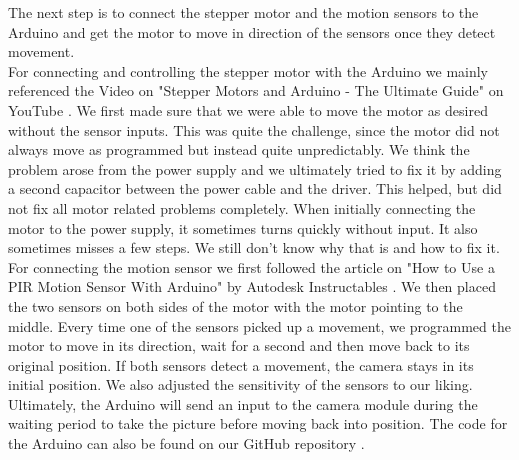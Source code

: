 \documentclass{article}
\begin{document}
The next step is to connect the stepper motor and the motion sensors to the Arduino and get the motor to move in direction of the sensors once they detect movement. \\
For connecting and controlling the stepper motor with the Arduino we mainly referenced the Video on "Stepper Motors and Arduino - The Ultimate Guide" on YouTube \cite{motor_video}. We first made sure that we were able to move the motor as desired without the sensor inputs. This was quite the challenge, since the motor did not always move as programmed but instead quite unpredictably. We think the problem arose from the power supply and we ultimately tried to fix it by adding a second capacitor between the power cable and the driver. This helped, but did not fix all motor related problems completely. When initially connecting the motor to the power supply, it sometimes turns quickly without input. It also sometimes misses a few steps. We still don't know why that is and how to fix it.\\
For connecting the motion sensor we first followed the article on "How to Use a PIR Motion Sensor With Arduino" by Autodesk Instructables \cite{motio_sensor_guide}. We then placed the two sensors on both sides of the motor with the motor pointing to the middle. Every time one of the sensors picked up a movement, we programmed the motor to move in its direction, wait for a second and then move back to its original position. If both sensors detect a movement, the camera stays in its initial position. We also adjusted the sensitivity of the sensors to our liking. Ultimately, the Arduino will send an input to the camera module during the waiting period to take the picture before moving back into position. The code for the Arduino can also be found on our GitHub repository \cite{github}. 
\end{document}
